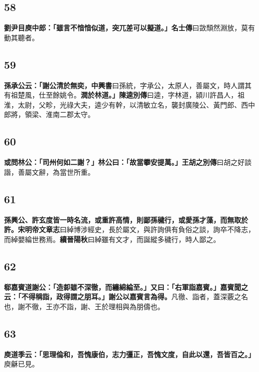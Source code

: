 \subsection*{58}

\textbf{劉尹目庾中郎：「雖言不愔愔似道，突兀差可以擬道。」}{\footnotesize \textbf{名士傳}曰敳頹然淵放，莫有動其聽者。}

\subsection*{59}

\textbf{孫承公云：「謝公清於無奕，}{\footnotesize \textbf{中興書}曰孫統，字承公，太原人，善屬文，時人謂其有祖楚風，仕至餘姚令。}\textbf{潤於林道。」}{\footnotesize \textbf{陳逵別傳}曰逵，字林道，潁川許昌人，祖淮，太尉，父畛，光祿大夫，逵少有幹，以清敏立名，襲封廣陵公、黃門郎、西中郎將，領梁、淮南二郡太守。}

\subsection*{60}

\textbf{或問林公：「司州何如二謝？」林公曰：「故當攀安提萬。」}{\footnotesize \textbf{王胡之別傳}曰胡之好談諧，善屬文辭，為當世所重。}

\subsection*{61}

\textbf{孫興公、許玄度皆一時名流，或重許高情，則鄙孫穢行，或愛孫才藻，而無取於許。}{\footnotesize \textbf{宋明帝文章志}曰綽博涉經史，長於屬文，與許詢俱有負俗之談，詢卒不降志，而綽嬰綸世務焉。\textbf{續晉陽秋}曰綽雖有文才，而誕縱多穢行，時人鄙之。}

\subsection*{62}

\textbf{郗嘉賓道謝公：「造厀雖不深徹，而纏綿綸至。」又曰：「右軍詣嘉賓。」嘉賓聞之云：「不得稱詣，政得謂之朋耳。」謝公以嘉賓言為得。}{\footnotesize 凡徹、詣者，蓋深覈之名也，謝不徹，王亦不詣，謝、王於理相與為朋儔也。}

\subsection*{63}

\textbf{庾道季云：「思理倫和，吾愧康伯，志力彊正，吾愧文度，自此以還，吾皆百之。」}{\footnotesize 庾龢已見。}

